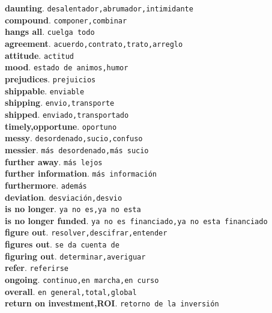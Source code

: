 \documentclass[twocolumn]{article}
\begin{document}
	\textsf{\textbf{daunting}}. \texttt{desalentador,abrumador,intimidante}\\
	\textsf{\textbf{compound}}. \texttt{componer,combinar}\\
	\textsf{\textbf{hangs all}}. \texttt{cuelga todo}\\
	\textsf{\textbf{agreement}}. \texttt{acuerdo,contrato,trato,arreglo}\\
	\textsf{\textbf{attitude}}. \texttt{actitud}\\
	\textsf{\textbf{mood}}. \texttt{estado de animos,humor}\\
	\textsf{\textbf{prejudices}}. \texttt{prejuicios}\\
	\textsf{\textbf{shippable}}. \texttt{enviable}\\
	\textsf{\textbf{shipping}}. \texttt{envio,transporte}\\
	\textsf{\textbf{shipped}}. \texttt{enviado,transportado}\\
	\textsf{\textbf{timely,opportune}}. \texttt{oportuno}\\
	\textsf{\textbf{messy}}. \texttt{desordenado,sucio,confuso}\\
	\textsf{\textbf{messier}}. \texttt{m\'as desordenado,m\'as sucio}\\
	\textsf{\textbf{further away}}. \texttt{m\'as lejos}\\
	\textsf{\textbf{further information}}. \texttt{m\'as informaci\'on}\\
	\textsf{\textbf{furthermore}}. \texttt{adem\'as}\\
	\textsf{\textbf{deviation}}. \texttt{desviaci\'on,desvio}\\
	\textsf{\textbf{is no longer}}. \texttt{ya no es,ya no esta}\\
	\textsf{\textbf{is no longer funded}}. \texttt{ya no es financiado,ya no esta financiado}\\
	\textsf{\textbf{figure out}}. \texttt{resolver,descifrar,entender}\\
	\textsf{\textbf{figures out}}. \texttt{se da cuenta de}\\
	\textsf{\textbf{figuring out}}. \texttt{determinar,averiguar}\\
	\textsf{\textbf{refer}}. \texttt{referirse}\\
	\textsf{\textbf{ongoing}}. \texttt{continuo,en marcha,en curso}\\
	\textsf{\textbf{overall}}. \texttt{en general,total,global}\\
	\textsf{\textbf{return on investment,ROI}}. \texttt{retorno de la inversi\'on}\\
\end{document}
